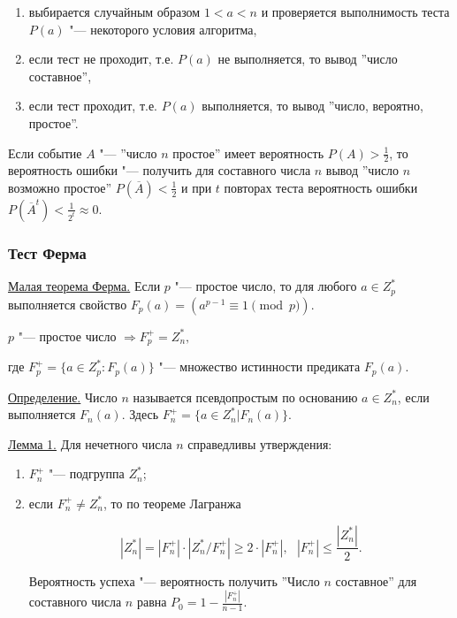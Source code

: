 \documentclass[bachelor, och, labwork]{shiza}
\begin{document}
        \begin{enumerate}
            \item выбирается случайным образом $1 < a < n$ и проверяется
            выполнимость теста $P(a)$ "--- некоторого условия алгоритма,
            \item если тест не проходит, т.е. $P(a)$ не выполняется, то вывод
            ''число составное'',
            \item если тест проходит, т.е. $P(a)$ выполняется, то вывод ''число,
            вероятно, простое''.
        \end{enumerate}

        Если событие $A$ "--- ''число $n$ простое'' имеет вероятность $ P(A) >
        \frac{1}{2}$, то вероятность ошибки "--- получить для составного числа
        $n$ вывод ''число $n$ возможно простое'' $P(\overline{A}) < \frac{1}{2}$
        и при $t$ повторах теста вероятность ошибки $P(\overline{A}^t) <
        \frac{1}{2^t} \approx 0.$

        \subsubsection{Тест Ферма}

            \underline{Малая теорема Ферма.} Если $p$ "--- простое число, то для
            любого $a \in Z^*_p$ выполняется свойство $F_p (a) = (a^{p - 1}
            \equiv 1 \pmod p).$

            $p$ "--- простое число $\Longrightarrow F^+_p = Z^*_n,$

            где $F^+_p = \{a \in Z^*_p : F_p (a)\}$ "--- множество
            истинности предиката $F_p (a).$

            \underline{Определение.} Число $n$ называется псевдопростым по основанию
            $a \in Z^*_n$, если выполняется $F_n (a).$ Здесь $F^+_n = \{a
            \in Z^*_n | F_n (a)\}.$

            \underline{Лемма 1.} Для нечетного числа $n$ справедливы утверждения:

            \begin{enumerate}
                \item $F^+_n$ "--- подгруппа $Z^*_n$;
                \item если $F^+_n \neq Z^*_n$, то по теореме Лагранжа
                
                $$|Z^*_n| = |F^+_n| \cdot |Z^*_n / F^+_n| \geq 2 \cdot |F^+_n|,
                \text{  } |F^+_n| \leq \frac{|Z^*_n|}{2}.$$

                Вероятность успеха "--- вероятность получить ''Число $n$ составное''
                для составного числа $n$ равна $P_0 = 1 - \frac{|F^+_n|}{n - 1}.$
            \end{enumerate}
\end{document}
